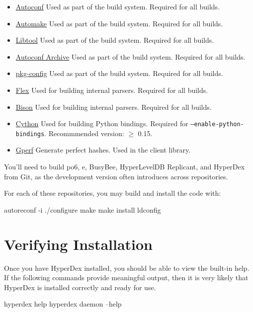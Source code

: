 \begin{itemize}
\item \href{http://www.gnu.org/software/autoconf/}{Autoconf} Used as part of
    the build system.  Required for all builds.
\item \href{http://www.gnu.org/software/automake/}{Automake} Used as part of
    the build system.  Required for all builds.
\item \href{http://www.gnu.org/software/libtool/}{Libtool} Used as part of the
    build system.  Required for all builds.
\item \href{http://www.gnu.org/software/autoconf-archive/}{Autoconf Archive}
    Used as part of the build system.  Required for all builds.
\item \href{http://www.freedesktop.org/wiki/Software/pkg-config/}{pkg-config}
    Used as part of the build system.  Required for all builds.
\item \href{http://flex.sourceforge.net/}{Flex} Used for building internal
    parsers.  Required for all builds.
\item \href{http://www.gnu.org/software/bison/}{Bison} Used for building
    internal parsers.  Required for all builds.
\item \href{http://cython.org/}{Cython} Used for building Python bindings.
    Required for \texttt{--enable-python-bindings}.
    Recommmended version: $\ge$ 0.15.
\item \href{http://www.gnu.org/software/gperf/}{Gperf}  Generate perfect
    hashes.  Used in the client library.
\end{itemize}

You'll need to build po6, e, BusyBee, HyperLevelDB Replicant, and HyperDex from
Git, as the development version often introduces across repositories.

For each of these repositories, you may build and install the code with:

\begin{consolecode}
autoreconf -i
./configure
make
make install
ldconfig
\end{consolecode}

\section{Verifying Installation}

Once you have HyperDex installed, you should be able to view the built-in help.
If the following commands provide meaningful output, then it is very likely that
HyperDex is installed correctly and ready for use.

\begin{consolecode}
hyperdex help
hyperdex daemon --help
\end{consolecode}
